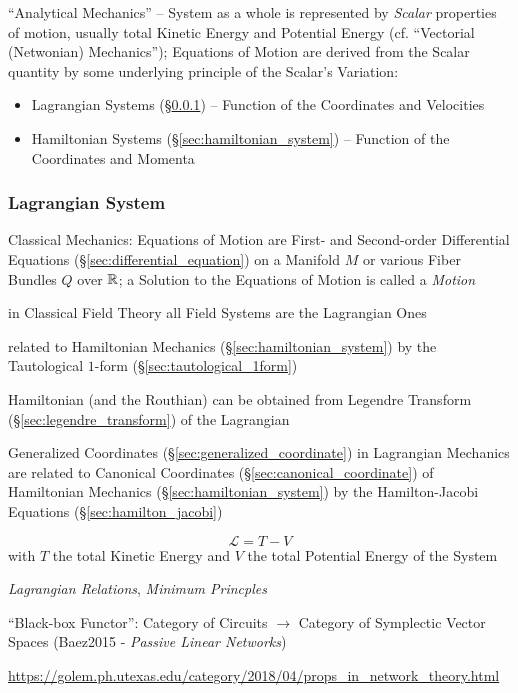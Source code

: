 ``Analytical Mechanics'' -- System as a whole is represented by \emph{Scalar}
properties of motion, usually total Kinetic Energy and Potential Energy (cf.
``Vectorial (Netwonian) Mechanics''); Equations of Motion are derived from the
Scalar quantity by some underlying principle of the Scalar's Variation:
\begin{itemize}
  \item Lagrangian Systems (\S\ref{sec:lagrangian_system}) -- Function of the
    Coordinates and Velocities
  \item Hamiltonian Systems (\S\ref{sec:hamiltonian_system}) -- Function of the
    Coordinates and Momenta
\end{itemize}



\subsubsection{Lagrangian System}\label{sec:lagrangian_system}

Classical Mechanics: Equations of Motion are First- and Second-order
Differential Equations (\S\ref{sec:differential_equation}) on a Manifold $M$ or
various Fiber Bundles $Q$ over $\mathbb{R}$; a Solution to the Equations of Motion
is called a \emph{Motion}

in Classical Field Theory all Field Systems are the Lagrangian Ones

related to Hamiltonian Mechanics (\S\ref{sec:hamiltonian_system}) by the
Tautological $1$-form (\S\ref{sec:tautological_1form})

Hamiltonian (and the Routhian) can be obtained from Legendre Transform
(\S\ref{sec:legendre_transform}) of the Lagrangian

Generalized Coordinates (\S\ref{sec:generalized_coordinate}) in Lagrangian
Mechanics are related to Canonical Coordinates
(\S\ref{sec:canonical_coordinate}) of Hamiltonian Mechanics
(\S\ref{sec:hamiltonian_system}) by the Hamilton-Jacobi Equations
(\S\ref{sec:hamilton_jacobi})

\[
  \mathcal{L} = T - V
\]
with $T$ the total Kinetic Energy and $V$ the total Potential Energy of the
System

\emph{Lagrangian Relations}, \emph{Minimum Princples}

``Black-box Functor'': Category of Circuits $\rightarrow$ Category of
Symplectic Vector Spaces (Baez2015 - \emph{Passive Linear Networks})

\url{https://golem.ph.utexas.edu/category/2018/04/props_in_network_theory.html}

